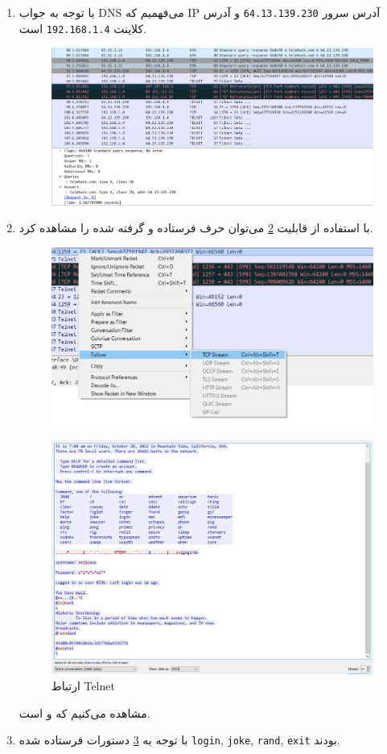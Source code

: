 \documentclass{perassignments}
\begin{document}
	\begin{enumerate}
		\item
		با توجه به جواب DNS می‌فهمیم که IP آدرس سرور 
		\texttt{64.13.139.230}
		و آدرس کلاینت 
		\texttt{192.168.1.4}
		است.
		\begin{figure}[H]
			\centering
			\includegraphics[width= 0.7\linewidth]{graphics/2a.png}
			\caption{}
			\label{fig:2a}
		\end{figure}
		\item 
		با استفاده از قابلیت 
		\ref{fig:2b} 
		می‌توان حرف فرستاده و گرفته شده را مشاهده کرد.
		\begin{figure}[H]
			\centering
			\includegraphics[width= 0.7\linewidth]{graphics/2b.png}
			\caption{}
			\label{fig:2b}
		\end{figure}
	\begin{figure}[H]
		\centering
		\includegraphics[width= 0.7\linewidth]{graphics/2c.png}
		\caption{ارتباط Telnet}
		\label{fig:2c}
	\end{figure}
	مشاهده می‌کنیم که 
	و 
	است. 
	\item 
	با توجه به 
	\ref{fig:2c}
	دستورات فرستاده شده 
		\texttt{login}, \texttt{joke}, \texttt{rand}, \texttt{exit}
	بودند.
	\end{enumerate}
\end{document}

